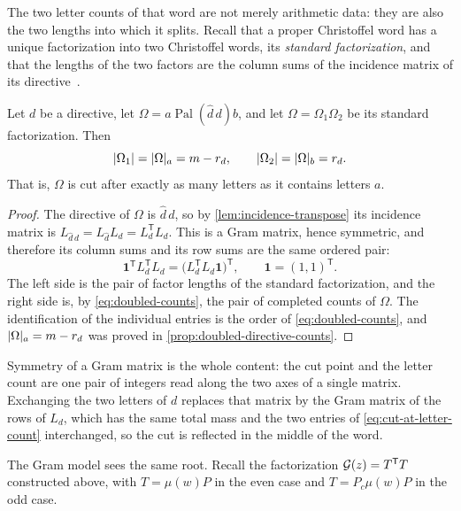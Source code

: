 The two letter counts of that word are not merely arithmetic data: they are
also the two lengths into which it splits. Recall that a proper Christoffel
word has a unique factorization into two Christoffel words, its
\emph{standard factorization}, and that the lengths of the two factors are the
column sums of the incidence matrix of its
directive~\cite[Corollaries~3.1--3.2]{BertheDeLucaReutenauer2008}.

\begin{corollary}
\label{cor:cut-at-letter-count}
Let $d$ be a directive, let
$\Omega=a\operatorname{Pal}(\widehat d\,d)b$, and let
$\Omega=\Omega_1\Omega_2$ be its standard factorization. Then
\begin{equation}\label{eq:cut-at-letter-count}
 \lvert\Omega_1\rvert=\lvert\Omega\rvert_a=m-r_d,
 \qquad
 \lvert\Omega_2\rvert=\lvert\Omega\rvert_b=r_d .
\end{equation}
That is, $\Omega$ is cut after exactly as many letters as it contains
letters $a$.
\end{corollary}

\begin{proof}
The directive of $\Omega$ is $\widehat d\,d$, so by
\cref{lem:incidence-transpose} its incidence matrix is
$L_{\widehat d\,d}=L_{\widehat d}L_d=L_d^{\mathsf T}L_d$. This is a Gram
matrix, hence symmetric, and therefore its column sums and its row sums are
the same ordered pair:
$$
 \mathbf 1^{\mathsf T}L_d^{\mathsf T}L_d
 =\bigl(L_d^{\mathsf T}L_d\mathbf 1\bigr)^{\mathsf T},
 \qquad \mathbf 1=(1,1)^{\mathsf T}.
$$
The left side is the pair of factor lengths of the standard factorization,
and the right side is, by \eqref{eq:doubled-counts}, the pair of completed
counts of $\Omega$. The identification of the individual entries is the
order of \eqref{eq:doubled-counts}, and $\lvert\Omega\rvert_a=m-r_d$ was proved in
\cref{prop:doubled-directive-counts}.
\end{proof}

Symmetry of a Gram matrix is the whole content: the cut point and the letter
count are one pair of integers read along the two axes of a single matrix.
Exchanging the two letters of $d$ replaces that matrix by the Gram matrix of
the rows of $L_d$, which has the same total mass and the two entries of
\eqref{eq:cut-at-letter-count} interchanged, so the cut is reflected in the
middle of the word.

The Gram model sees the same root. Recall the factorization
$\mathcal{G}(z)=T^{\mathsf T}T$ constructed above, with $T=\mu(w)P$ in the even
case and $T=P_c\mu(w)P$ in the odd case.

